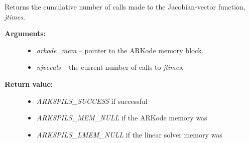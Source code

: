 \documentclass[letterpaper,10pt,english]{sphinxmanual}
\begin{document}
\begin{fulllineitems}
\label{c_interface/User_callable:c.ARKSpilsGetNumJtimesEvals}
Returns the cumulative number of calls made to the
Jacobian-vector function, \emph{jtimes}.
\begin{description}
\item[{\textbf{Arguments:}}] \leavevmode\begin{itemize}
\item {} 
\emph{arkode\_mem} -- pointer to the ARKode memory block.

\item {} 
\emph{njvevals} -- the current number of calls to \emph{jtimes}.

\end{itemize}

\item[{\textbf{Return value:}}] \leavevmode\begin{itemize}
\item {} 
\emph{ARKSPILS\_SUCCESS} if successful

\item {} 
\emph{ARKSPILS\_MEM\_NULL} if the ARKode memory was 

\item {} 
\emph{ARKSPILS\_LMEM\_NULL} if the linear solver memory was 

\end{itemize}

\end{description}

\end{fulllineitems}

\end{document}
